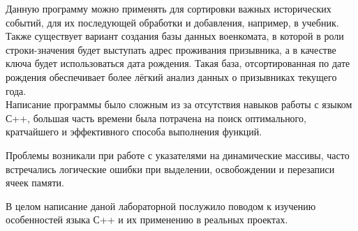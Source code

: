 \documentclass[12pt]{article}
\begin{document}
Данную программу можно применять для сортировки важных исторических событий, для их последующей обработки и добавления, например, в учебник.\\

Также существует вариант создания базы данных военкомата, в которой в роли строки-значения будет выступать адрес проживания призывника, а в качестве ключа будет использоваться дата рождения. Такая база, отсортированная по дате рождения обеспечивает более лёгкий анализ данных о призывниках текущего года.\\


Написание программы было сложным из за отсутствия навыков работы с языком С++, большая часть времени была потрачена на поиск оптимального, кратчайшего и эффективного способа выполнения функций.


Проблемы возникали при работе с указателями на динамические массивы, часто встречались логические ошибки при выделении, освобождении и перезаписи ячеек памяти.


В целом написание даной лабораторной послужило поводом к изучению особенностей языка С++ и их применению в реальных проектах.


\end{document}
